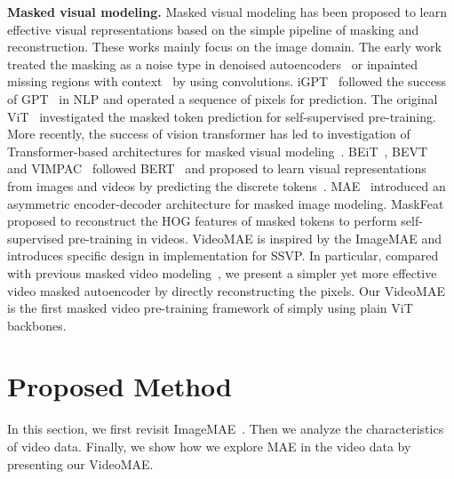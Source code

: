 \documentclass{article}
\begin{document}
\par{\noindent \textbf{Masked visual modeling.}} 
Masked visual modeling has been proposed to learn effective visual representations based on the simple pipeline of masking and reconstruction. These works mainly focus on the image domain. The early work~\cite{VincentLLBM10} treated the masking as a noise type in denoised autoencoders~\cite{VincentLBM08} or inpainted missing regions with context~\cite{PathakKDDE16} by using convolutions. 
iGPT~\cite{iGPT20} followed the success of GPT~\cite{Brown2020,radford2019language} in NLP and operated a sequence of pixels for prediction. The original ViT~\cite{vit} investigated the masked token prediction for self-supervised pre-training. More recently, the success of 
vision transformer has led to investigation of Transformer-based architectures for masked visual modeling~\cite{beit,dong2021peco,he2021masked,wei2021masked,xie2021simmim,zhou2021ibot}. BEiT~\cite{beit}, BEVT~\cite{bevt} and VIMPAC~\cite{vimpac} followed BERT~\cite{devlin2019bert} and proposed to learn visual representations from images and videos by predicting the discrete tokens~\cite{dalle}. MAE~\cite{he2021masked} introduced an asymmetric encoder-decoder architecture for masked image modeling. MaskFeat~\cite{wei2021masked} proposed to reconstruct the HOG features of masked tokens to perform self-supervised pre-training in videos. VideoMAE is inspired by the ImageMAE and introduces specific design in implementation for SSVP. In particular, compared with previous masked video modeling~\cite{he2021masked,bevt,vimpac}, we present a simpler yet more effective video masked autoencoder by directly reconstructing the pixels. Our VideoMAE is the first masked video pre-training framework of simply using plain ViT backbones.

\section{Proposed Method}
In this section, we first revisit ImageMAE~\cite{he2021masked}. Then we analyze the characteristics of video data. Finally, we show how we explore MAE in the video data by presenting our VideoMAE.
\end{document}
